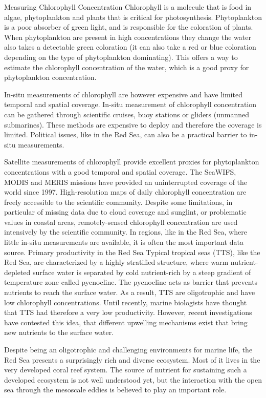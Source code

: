 Measuring Chlorophyll Concentration
Chlorophyll is a molecule that is food in algae, phytoplankton and plants that is critical for photosynthesis. Phytoplankton is a poor absorber of green light, and is responsible for the coloration of plants. When phytoplankton are present in high concentrations they change the water also takes a detectable green coloration (it can also take a red or blue coloration depending on the type of phytoplankton dominating). This offers a way to estimate the chlorophyll concentration of the water, which is a good proxy for phytoplankton concentration. 

In-situ measurements of chlorophyll are however expensive and have limited temporal and spatial coverage. In-situ measurement of chlorophyll concentration can be gathered through scientific cruises, buoy stations or gliders (unmanned submarines). These methods are expensive to deploy and therefore the coverage is limited. Political issues, like in the Red Sea, can also be a practical barrier to in-situ measurements. 

Satellite measurements of chlorophyll provide excellent proxies for phytoplankton concentrations with a good temporal and spatial coverage. The SeaWIFS, MODIS and MERIS missions have provided an uninterrupted coverage of the world since 1997. High-resolution maps of daily chlorophyll concentration are freely accessible to the scientific community. Despite some limitations, in particular of missing data due to cloud coverage and sunglint, or problematic values in coastal areas, remotely-sensed chlorophyll concentration are used intensively by the scientific community. In regions, like in the Red Sea, where little in-situ measurements are available, it is often the most important data source. 
Primary productivity in the Red Sea
Typical tropical seas (TTS), like the Red Sea, are characterized by a highly stratified structure, where warm nutrient-depleted surface water is separated by cold nutrient-rich by a steep gradient of temperature zone called pycnocline. The pycnocline acts as barrier that prevents nutrients to reach the surface water. As a result, TTS are oligotrophic and have low chlorophyll concentrations. Until recently, marine biologists have thought that TTS had therefore a very low productivity. However, recent investigations have contested this idea, that different upwelling mechanisms exist that bring new nutrients to the surface water. 

Despite being an oligotrophic and challenging environments for marine life, the Red Sea presents a surprisingly rich and diverse ecosystem. Most of it lives in the very developed coral reef system. The source of nutrient for sustaining such a developed ecosystem is not well understood yet, but the interaction with the open sea through the mesoscale eddies is believed to play an important role. 

